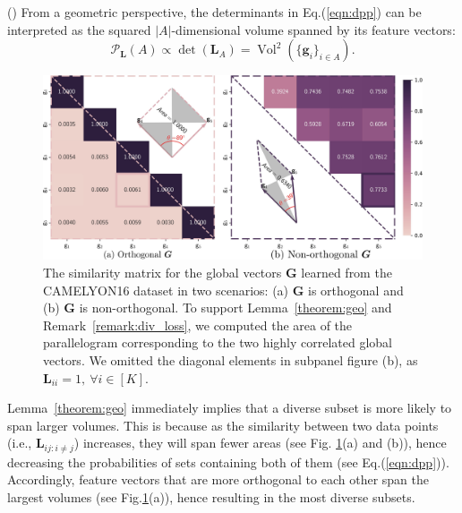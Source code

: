 \documentclass[runningheads]{llncs}
\begin{document}
\begin{lemma} (\cite{kulesza2012determinantal})\label{theorem:geo}
    From a geometric perspective, the determinants in Eq.(\ref{eqn:dpp}) can be interpreted as the squared $|A|$-dimensional volume spanned by its feature vectors:
    \begin{equation}
    \mathcal{P}_{\boldsymbol{L}}(A) \propto \operatorname{det}\left(\boldsymbol{L}_{A}\right) = \operatorname{Vol}^2(\{ \boldsymbol{g}_i \}_{i \in A} ).
\label{eqn:dpp_geo}
\end{equation}

\end{lemma}

\begin{figure}[!t]
    \centering
    \includegraphics[width=0.75\columnwidth]{Figure/diversity_v2.jpg}
    \caption{The similarity matrix for the global vectors $\boldsymbol{G}$ learned from the CAMELYON16 dataset in two scenarios: (a) $\boldsymbol{G}$ is orthogonal and (b) $\boldsymbol{G}$ is non-orthogonal. To support Lemma~\ref{theorem:geo} and Remark~\ref{remark:div_loss}, we computed the area of the parallelogram corresponding to the two highly correlated global vectors. We omitted the diagonal elements in subpanel figure (b), as $\boldsymbol{L}_{ii}=1, \ \forall i\in [K]$. }
    \label{fig:diversity}
\end{figure}

Lemma~\ref{theorem:geo} immediately implies that a diverse subset is more likely to span larger volumes. This is because as the similarity between two data points (i.e., $\boldsymbol{L}_{ij: i \neq j}$) increases, they will span fewer areas (see Fig. \ref{fig:diversity}(a) and (b)), hence decreasing the probabilities of sets containing both of them (see Eq.(\ref{eqn:dpp})). Accordingly, feature vectors that are more orthogonal to each other span the largest volumes  (see Fig.\ref{fig:diversity}(a)), hence resulting in the most diverse subsets. 
\end{document}
